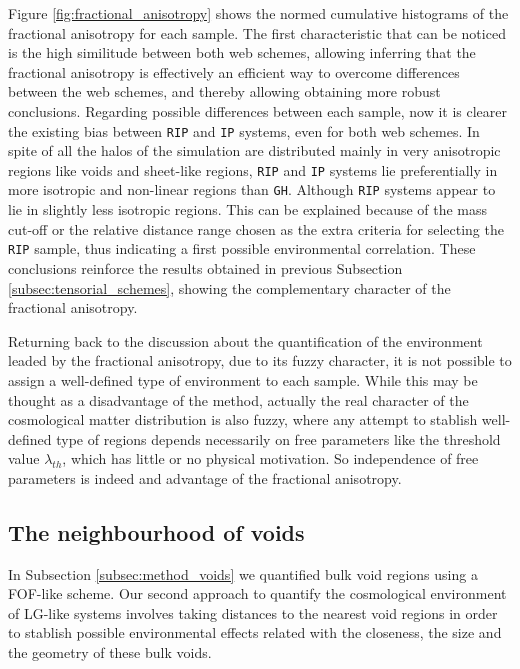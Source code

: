 \documentclass[usenatbib]{latex/mn2e}
\begin{document}
Figure \ref{fig:fractional_anisotropy} shows the normed cumulative 
histograms of the fractional anisotropy for each sample. The first 
characteristic that can be noticed is the high similitude between both web
schemes, allowing inferring that the fractional anisotropy is effectively
an efficient way to overcome differences between the web schemes, and 
thereby allowing obtaining more robust conclusions. Regarding possible 
differences between each sample, now it is clearer the existing bias 
between \texttt{RIP} and \texttt{IP} systems, even for both web schemes. 
In spite of all the halos of the simulation are distributed mainly in very 
anisotropic regions like voids and sheet-like regions, \texttt{RIP} and 
\texttt{IP} systems lie preferentially in more isotropic and non-linear 
regions than \texttt{GH}. Although \texttt{RIP} systems appear to lie in 
slightly less isotropic regions. This can be explained because of the mass 
cut-off or the relative distance range chosen as the extra criteria for 
selecting the \texttt{RIP} sample, thus indicating a first possible 
environmental correlation. These conclusions reinforce the results obtained 
in previous Subsection \ref{subsec:tensorial_schemes}, showing the 
complementary character of the fractional anisotropy. 



Returning back to the discussion about the quantification of the 
environment leaded by the fractional anisotropy, due to its fuzzy 
character, it is not possible to assign a well-defined type of environment 
to each sample. While this may be thought as a disadvantage of the method, 
actually the real character of the cosmological matter distribution is 
also fuzzy, where any attempt to stablish well-defined type of regions 
depends necessarily on free parameters like the threshold value 
$\lambda_{th}$, which has little or no physical motivation. So independence 
of free parameters is indeed and advantage of the fractional anisotropy.



\subsection{The neighbourhood of voids}
\label{subsec:neighbourhood_voids}



In Subsection \ref{subsec:method_voids} we quantified bulk void regions 
using a FOF-like scheme. Our second approach to quantify the cosmological
environment of LG-like systems involves taking distances to the nearest
void regions in order to stablish possible environmental effects related 
with the closeness, the size and the geometry of these bulk voids.
\end{document}
